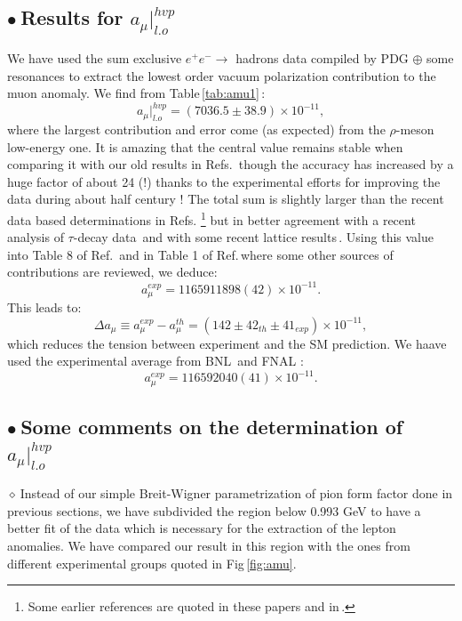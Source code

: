 \documentclass[review]{elsarticle}
\def\beq{\begin{equation}}
\def\eeq{\end{equation}}
\def\b{$\bullet~$}
\def\d{$\diamond~$}
\begin{document}
\subsection*{\b Results for $a_\mu\vert^{hvp}_{l.o}$} 
We have used  the sum  exclusive $e^+e^-\to$ hadrons data compiled by PDG $\oplus$ some resonances to extract the 
lowest order vacuum polarization contribution to the muon anomaly. We find from Table\,\ref{tab:amu1}\,:
\beq
a_\mu\vert^{hvp}_{l.o}=(7036.5\pm 38.9)\times 10^{-11},
\eeq
where the largest contribution and error come (as expected) from the $\rho$-meson low-energy one. It is amazing that the central value remains stable when comparing it with our old results in Refs.\,\cite{CALMET,SN76,SN78,SNamu} though the accuracy has increased by a huge factor of about 24 (!) thanks to the experimental efforts for improving the data during about half century !  The total sum is slightly larger  than the recent data based determinations in Refs.\,\cite{NOMURA,DAVIER2}\,\footnote{Some earlier references are quoted in these papers and in\,\cite{SNamu}.} but in better agreement with a recent analysis of $\tau$-decay data\,\cite{MIRANDA}  and with some recent lattice results\,\cite{RAF,GM2,LATTICE}.  Using this value into Table 8 of Ref.\,\cite{KNECHT} and in Table 1 of Ref.\,\cite{GM2}where some other sources of contributions are reviewed, we deduce:
\beq
a_\mu^{exp}= 1165911898(42)\times 10^{-11}.
\eeq
This leads to:
\beq
\Delta a_\mu\equiv a_\mu^{exp}-a_\mu^{th} = (142\pm 42_{th}\pm 41_{exp})\times 10^{-11},
\label{eq:amu-sm}
\eeq
which reduces the tension between experiment and the SM prediction. We haave used the experimental average from BNL\,\cite{BNL} and FNAL\,\cite{FNAL}\,:
\beq
a_\mu^{exp}= 116592040(41)\times 10^{-11}.
\eeq
\subsection*{\b Some comments on the determination of  $a_\mu\vert^{hvp}_{l.o}$} 
\d  Instead of our simple Breit-Wigner parametrization of pion form factor done in previous sections, we have subdivided the region below 0.993 GeV to have a better fit of the data which is necessary for the extraction of the lepton anomalies. 
We have compared our result in this region with  the ones from different experimental groups quoted in Fig\,\ref{fig:amu}.
\end{document}
